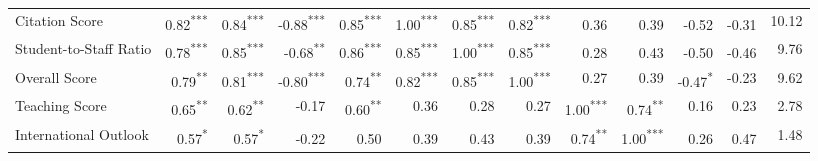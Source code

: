 \documentclass[conference]{IEEEtran}
\begin{document}
\begin{table*}[h!]
\begin{tabular}{|l|r|r|r|r|r|r|r|r|r|r|r|r|}
		Citation Score & \cellcolor{gray!44}0.82\textsuperscript{***} & \cellcolor{gray!43}0.84\textsuperscript{***} & \cellcolor{gray!50}-0.88\textsuperscript{***} & \cellcolor{gray!44}0.85\textsuperscript{***} & \cellcolor{gray!50}1.00\textsuperscript{***} & \cellcolor{gray!44}0.85\textsuperscript{***} & \cellcolor{gray!44}0.82\textsuperscript{***} & \cellcolor{gray!09}0.36\textsuperscript{} & \cellcolor{gray!19}0.39\textsuperscript{} & \cellcolor{gray!20}-0.52\textsuperscript{} & \cellcolor{gray!15}-0.31\textsuperscript{} & 10.12 \\
		
		Student-to-Staff Ratio & \cellcolor{gray!36}0.78\textsuperscript{***} & \cellcolor{gray!44}0.85\textsuperscript{***} & \cellcolor{gray!22}-0.68\textsuperscript{**} & \cellcolor{gray!44}0.86\textsuperscript{***} & \cellcolor{gray!44}0.85\textsuperscript{***} & \cellcolor{gray!50}1.00\textsuperscript{***} & \cellcolor{gray!44}0.85\textsuperscript{***} & \cellcolor{gray!11}0.28\textsuperscript{} & \cellcolor{gray!21}0.43\textsuperscript{} & \cellcolor{gray!20}-0.50\textsuperscript{} & \cellcolor{gray!18}-0.46\textsuperscript{} & 9.76 \\
		
		Overall Score & \cellcolor{gray!39}0.79\textsuperscript{**} & \cellcolor{gray!40}0.81\textsuperscript{***} & \cellcolor{gray!40}-0.80\textsuperscript{***} & \cellcolor{gray!37}0.74\textsuperscript{**} & \cellcolor{gray!41}0.82\textsuperscript{***} & \cellcolor{gray!42}0.85\textsuperscript{***} & \cellcolor{gray!50}1.00\textsuperscript{***} & \cellcolor{gray!13}0.27 & \cellcolor{gray!19}0.39 & \cellcolor{gray!23}-0.47\textsuperscript{*} & \cellcolor{gray!11}-0.23 & 9.62 \\
		
		Teaching Score & \cellcolor{gray!32}0.65\textsuperscript{**} & \cellcolor{gray!31}0.62\textsuperscript{**} & \cellcolor{gray!8}-0.17 & \cellcolor{gray!30}0.60\textsuperscript{**} & \cellcolor{gray!18}0.36 & \cellcolor{gray!14}0.28 & \cellcolor{gray!13}0.27 & \cellcolor{gray!50}1.00\textsuperscript{***} & \cellcolor{gray!37}0.74\textsuperscript{**} & \cellcolor{gray!8}0.16 & \cellcolor{gray!11}0.23 & 2.78 \\
		
		International Outlook & \cellcolor{gray!28}0.57\textsuperscript{*} & \cellcolor{gray!28}0.57\textsuperscript{*} & \cellcolor{gray!11}-0.22\textsuperscript{} & \cellcolor{gray!25}0.50\textsuperscript{} & \cellcolor{gray!19}0.39\textsuperscript{} & \cellcolor{gray!21}0.43\textsuperscript{} & \cellcolor{gray!19}0.39\textsuperscript{} & \cellcolor{gray!37}0.74\textsuperscript{**} & \cellcolor{gray!50}1.00\textsuperscript{***} & \cellcolor{gray!13}0.26\textsuperscript{} & \cellcolor{gray!23}0.47\textsuperscript{} & 1.48 \\
		

\end{tabular}
\end{table*}
\end{document}
